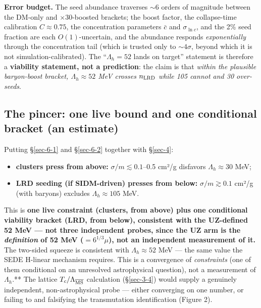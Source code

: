 \documentclass[preprint,12pt]{elsarticle}
\providecommand{\tightlist}{\setlength{\itemsep}{0pt}\setlength{\parskip}{0pt}}
\begin{document}
\textbf{Error budget.} The seed abundance traverses \(\sim 6\) orders of
magnitude between the DM-only and \(\times30\)-boosted brackets; the
boost factor, the collapse-time calibration \(C \approx 0.75\), the
concentration parameters \(\bar c\) and \(\sigma_{\ln c}\), and the 2\%
seed fraction are each \(O(1)\)-uncertain, and the abundance responds
\emph{exponentially} through the concentration tail (which is trusted
only to \(\sim 4\sigma\), beyond which it is not simulation-calibrated).
The ``\(\Lambda_h = 52\) lands on target'' statement is therefore a
\textbf{viability statement, not a prediction}: the claim is that
\emph{within the plausible baryon-boost bracket,
\(\Lambda_h \approx 52\) MeV crosses \(n_{\rm LRD}\) while 105 cannot
and 30 over-seeds}.

\subsection{The pincer: one live bound and one conditional bracket (an
estimate)}\label{sec-6-3}

Putting §\ref{sec-6-1} and §\ref{sec-6-2} together with §\ref{sec-4}:

\begin{itemize}
\tightlist
\item
  \textbf{clusters press from above:} \(\sigma/m \lesssim 0.1\)--0.5
  cm²/g disfavors \(\Lambda_h \approx 30\) MeV;
\item
  \textbf{LRD seeding (if SIDM-driven) presses from below:}
  \(\sigma/m \gtrsim 0.1\) cm²/g (with baryons) excludes
  \(\Lambda_h \approx 105\) MeV.
\end{itemize}

This is \textbf{one live constraint (clusters, from above) plus one
conditional viability bracket (LRD, from below), consistent with the
UZ-defined 52 MeV --- not three independent probes, since the UZ arm is
the \emph{definition} of 52 MeV (\(=6^{1/3}\mu\)), not an independent
measurement of it.} The two-sided squeeze is consistent with
\(\Lambda_h \approx 52\) MeV --- the same value the SEDE H-linear
mechanism requires. This is a convergence of \emph{constraints} (one of
them conditional on an unresolved astrophysical question), not a
measurement of \(\Lambda_h\).** The lattice
\(T_c/\Lambda_{\overline{\rm MS}}\) calculation (§\ref{sec-3-4}) would
supply a genuinely independent, non-astrophysical probe --- either
converging on one number, or failing to and falsifying the transmutation
identification (Figure 2).
\end{document}
